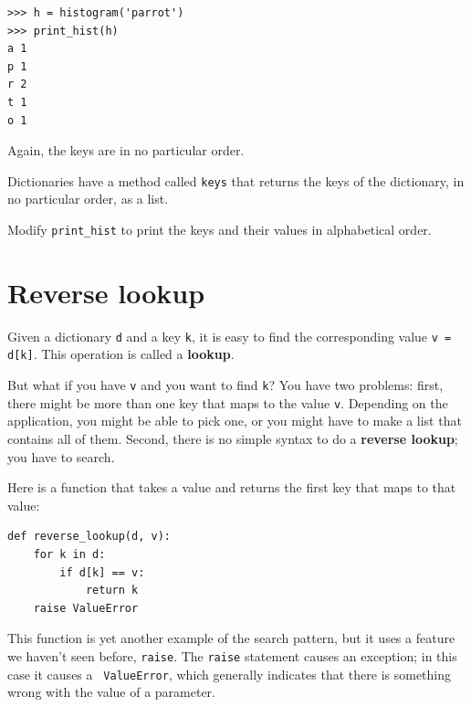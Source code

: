 \documentclass[10pt]{book}
\begin{document}
\beforeverb
\begin{verbatim}
>>> h = histogram('parrot')
>>> print_hist(h)
a 1
p 1
r 2
t 1
o 1
\end{verbatim}
\afterverb
%
Again, the keys are in no particular order.

\begin{ex}


Dictionaries have a method called {\tt keys} that returns
the keys of the dictionary, in no particular order, as a list.

Modify \verb"print_hist" to print the keys and their values
in alphabetical order.
\end{ex}



\section{Reverse lookup}


Given a dictionary {\tt d} and a key {\tt k}, it is easy to
find the corresponding value {\tt v = d[k]}.  This operation
is called a {\bf lookup}.

But what if you have {\tt v} and you want to find {\tt k}?
You have two problems: first, there might be more than one
key that maps to the value {\tt v}.  Depending on the application,
you might be able to pick one, or you might have to make
a list that contains all of them.  Second, there is no
simple syntax to do a {\bf reverse lookup}; you have to search.

Here is a function that takes a value and returns the first
key that maps to that value:

\beforeverb
\begin{verbatim}
def reverse_lookup(d, v):
    for k in d:
        if d[k] == v:
            return k
    raise ValueError
\end{verbatim}
\afterverb
%
This function is yet another example of the search pattern, but it
uses a feature we haven't seen before, {\tt raise}.  The {\tt raise}
statement causes an exception; in this case it causes a {\tt
  ValueError}, which generally indicates that there is something wrong
with the value of a parameter.

\end{document}
